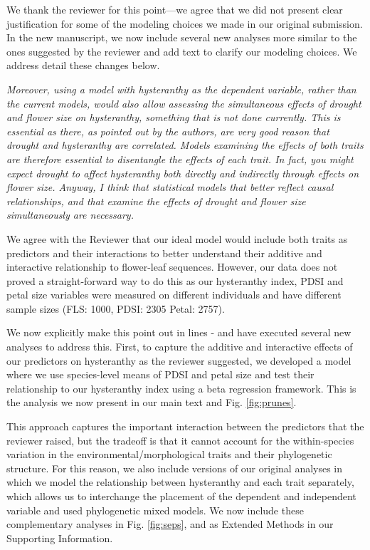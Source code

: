 \documentclass{article}[12pt]
\begin{document}
We thank the reviewer for this point---we agree that we did not present clear justification for some of the modeling choices we made in our original submission. In the new manuscript, we now include several new analyses more similar to the ones suggested by the reviewer and add text to clarify our modeling choices. We address detail these changes below.

\emph{Moreover, using a model with hysteranthy as the dependent variable, rather than the current models, would also allow assessing the simultaneous effects of drought and flower size on hysteranthy, something that is not done currently. This is essential as there, as pointed out by the authors, are very good reason that drought and hysteranthy are correlated. Models examining the effects of both traits are therefore essential to disentangle the effects of each trait. In fact, you might expect drought to affect hysteranthy both directly and indirectly through effects on flower size. Anyway, I think that statistical models that better reflect causal relationships, and that examine the effects of drought and flower size simultaneously are necessary.}

We agree with the Reviewer that our ideal model would include both traits as predictors and their interactions to better understand their additive and interactive relationship to flower-leaf sequences. However, our data does not proved a straight-forward way to do this as our hysteranthy index, PDSI and petal size variables were measured on different individuals and have different sample sizes (FLS: 1000, PDSI: 2305 Petal: 2757).

We now explicitly make this point out in lines - and have executed several new analyses to address this. First, to capture the additive and interactive effects of our predictors on hysteranthy  as the reviewer suggested, we developed a model where we use species-level means of PDSI and petal size and test their relationship to our hysteranthy index using a beta regression framework. This is the analysis we now present in our main text and Fig. \ref{fig:prunes}.

This approach captures the important interaction between the predictors that the reviewer raised, but the tradeoff is that it cannot account for the within-species variation in the environmental/morphological traits and their phylogenetic structure. For this reason, we also include versions of our original analyses in which we model the relationship between hysteranthy and each trait separately, which allows us to interchange the placement of the dependent and independent variable and used phylogenetic mixed models. We now include these complementary analyses in Fig. \ref{fig:seps}, and as Extended Methods in our Supporting Information.
\end{document}
